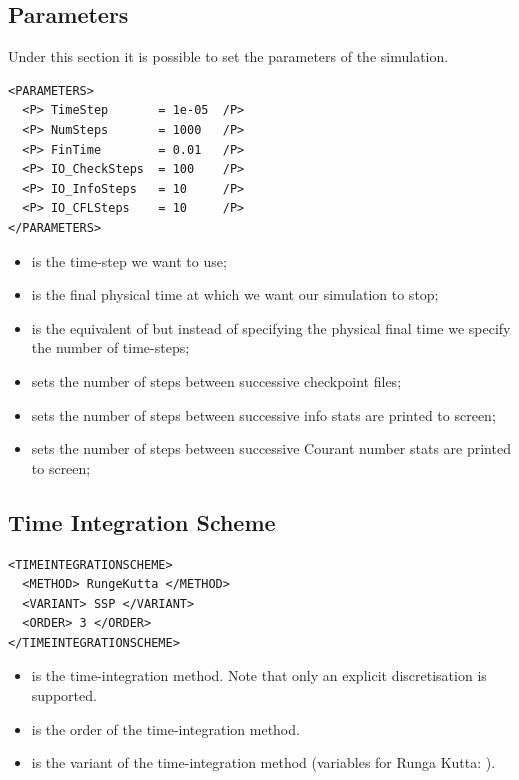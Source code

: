 \subsection*{Parameters}
Under this section it is possible to set the parameters of the simulation.
\begin{lstlisting}[style=XmlStyle]
<PARAMETERS>
  <P> TimeStep       = 1e-05  /P>
  <P> NumSteps       = 1000   /P>
  <P> FinTime        = 0.01   /P>
  <P> IO_CheckSteps  = 100    /P>
  <P> IO_InfoSteps   = 10     /P>
  <P> IO_CFLSteps    = 10     /P>
</PARAMETERS>
\end{lstlisting}
\begin{itemize}
    \item {} is the time-step we want to use;
    \item {} is the final physical time at which we want our simulation to stop;
    \item {} is the equivalent of  but instead of specifying the physical final time we specify the number of time-steps;
    \item {} sets the number of steps between successive checkpoint files;
    \item {} sets the number of steps between successive info stats are printed to screen;
    \item {} sets the number of steps between successive Courant number stats are printed to screen;
\end{itemize}

\subsection{Time Integration Scheme}
\begin{lstlisting}[style=XmlStyle]
<TIMEINTEGRATIONSCHEME>
  <METHOD> RungeKutta </METHOD>
  <VARIANT> SSP </VARIANT>
  <ORDER> 3 </ORDER>
</TIMEINTEGRATIONSCHEME>
\end{lstlisting}

\begin{itemize}
    \item {} is the time-integration method. 
    Note that only an explicit discretisation is supported.
    \item {} is the order of the time-integration method. 
    \item {} is the variant of the time-integration
      method (variables for Runga Kutta: ). 
\end{itemize}

